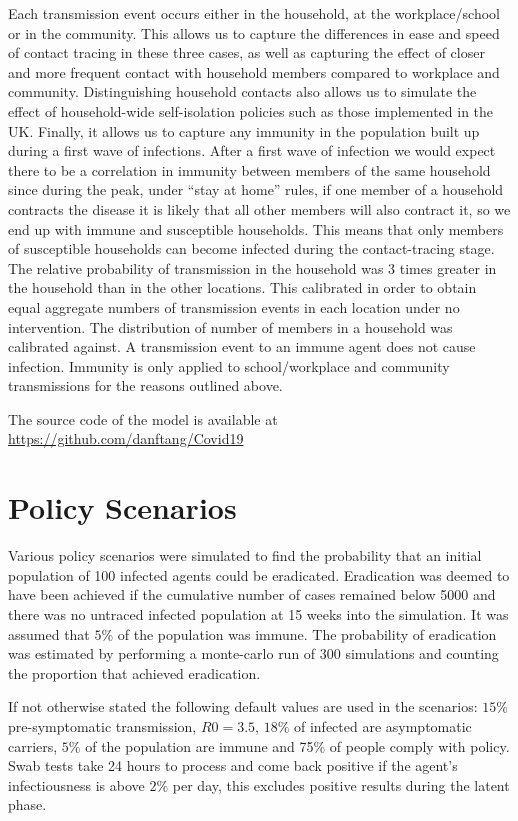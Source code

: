 \documentclass{article}
\begin{document}
Each transmission event occurs either in the household, at the workplace/school or in the community. This allows us to capture the differences in ease and speed of contact tracing in these three cases, as well as capturing the effect of closer and more frequent contact with household members compared to workplace and community. Distinguishing household contacts also allows us to simulate the effect of household-wide self-isolation policies such as those implemented in the UK. Finally, it allows us to capture any immunity in the population built up during a first wave of infections. After a first wave of infection we would expect there to be a correlation in immunity between members of the same household since during the peak, under ``stay at home'' rules, if one member of a household contracts the disease it is likely that all other members will also contract it, so we end up with immune and susceptible households. This means that only members of susceptible households can become infected during the contact-tracing stage. The relative probability of transmission in the household was 3 times greater in the household than in the other locations. This calibrated in order to obtain equal aggregate numbers of transmission events in each location under no intervention\cite{ferguson2020impact}. The distribution of number of members in a household was calibrated against\cite{smithHouseholds}. A transmission event to an immune agent does not cause infection. Immunity is only applied to school/workplace and community transmissions for the reasons outlined above.

The source code of the model is available at \href{https://github.com/danftang/Covid19}{https://github.com/danftang/Covid19}

\section{Policy Scenarios}

Various policy scenarios were simulated to find the probability that an initial population of 100 infected agents could be eradicated. Eradication was deemed to have been achieved if the cumulative number of cases remained below 5000 and there was no untraced infected population at 15 weeks into the simulation. It was assumed that $5\%$ of the population was immune. The probability of eradication was estimated by performing a monte-carlo run of 300 simulations and counting the proportion that achieved eradication.

If not otherwise stated the following default values are used in the scenarios: $15\%$ pre-symptomatic transmission, $R0 = 3.5$, $18\%$ of infected are asymptomatic carriers, $5\%$ of the population are immune and 75\% of people comply with policy. Swab tests take 24 hours to process and come back positive if the agent's infectiousness is above $2\%$ per day, this excludes positive results during the latent phase.
\end{document}
